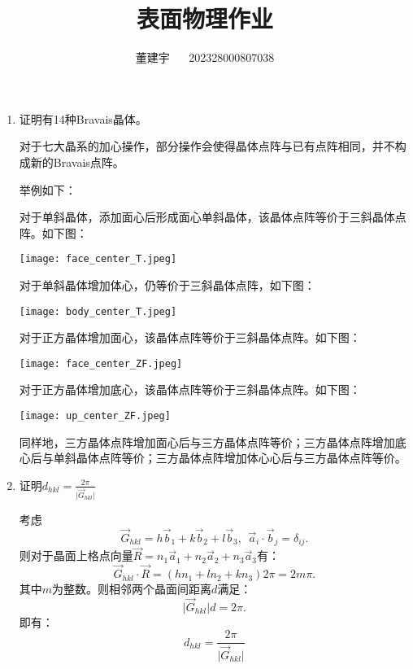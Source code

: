 \documentclass[reqno,a4paper,12pt]{amsart}
\title{表面物理作业}
\author{董建宇 ~~ 202328000807038}
\begin{document}
\maketitle
\titleformat{\section}[hang]{\small}{\thesection}{0.8em}{}{}
\titleformat{\subsection}[hang]{\small}{\thesubsection}{0.8em}{}{}

\begin{enumerate}
\item 证明有14种Bravais晶体。
\begin{tcolorbox}[breakable, colback = black!5!white, colframe = black]
对于七大晶系的加心操作，部分操作会使得晶体点阵与已有点阵相同，并不构成新的Bravais点阵。

举例如下：

对于单斜晶体，添加面心后形成面心单斜晶体，该晶体点阵等价于三斜晶体点阵。如下图：

\begin{center}
	\texttt{[image: face\_center\_T.jpeg]}
\end{center}

对于单斜晶体增加体心，仍等价于三斜晶体点阵，如下图：

\begin{center}
	\texttt{[image: body\_center\_T.jpeg]}
\end{center}

对于正方晶体增加面心，该晶体点阵等价于三斜晶体点阵。如下图：

\begin{center}
	\texttt{[image: face\_center\_ZF.jpeg]}
\end{center}

对于正方晶体增加底心，该晶体点阵等价于三斜晶体点阵。如下图：

\begin{center}
	\texttt{[image: up\_center\_ZF.jpeg]}
\end{center}

同样地，三方晶体点阵增加面心后与三方晶体点阵等价；三方晶体点阵增加底心后与单斜晶体点阵等价；三方晶体点阵增加体心心后与三方晶体点阵等价。

\end{tcolorbox}

\item 证明$d_{hkl} = \frac{2\pi}{\vert \vec{G}_{hkl} \vert}$
\begin{tcolorbox}[breakable, colback = black!5!white, colframe = black]
考虑
\[
	\vec{G}_{hkl} = h\vec{b}_1 + k\vec{b}_2 + l\vec{b}_3, ~~ \vec{a}_i \cdot \vec{b}_j = \delta_{ij}.
\]
则对于晶面上格点向量$\vec{R} = n_1\vec{a}_1 + n_2\vec{a}_2 + n_3 \vec{a}_3$有：
\[
	\vec{G}_{hkl} \cdot \vec{R} = (hn_1+ln_2+kn_3)2\pi = 2m\pi.
\]
其中$m$为整数。则相邻两个晶面间距离$d$满足：
\[
	\vert \vec{G}_{hkl} \vert d = 2\pi.
\]
即有：
\[
	d_{hkl} = \frac{2\pi}{\vert \vec{G}_{hkl} \vert}
\]
\end{tcolorbox}
\end{enumerate}
\end{document}
